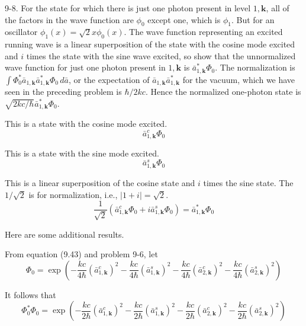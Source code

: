 \documentclass[12pt]{article}
\begin{document}
9-8.
For the state for which there is just one photon
present in level $1,\mathbf k$, all of the factors in the wave function are
$\phi_0$ except one, which is $\phi_1$.
But for an oscillator $\phi_1(x)=\sqrt2x\phi_0(x)$.
The wave function representing an excited running wave is a linear
superposition of the state with the cosine mode excited and $i$
times the state with the sine wave excited, so show that the
unnormalized wave function for just one photon present in
$1,\mathbf k$ is $\bar a_{1,\mathbf k}^*\Phi_0$.
The normalization is
$\int\Phi_0^*\bar a_{1,\mathbf k}\bar a_{1,\mathbf k}^*\Phi_0\,d\bar a$,
or the expectation of $\bar a_{1,\mathbf k}\bar a_{1,\mathbf k}^*$ for the
vacuum, which we have seen in the preceding problem is $\hbar/2kc$.
Hence the normalized one-photon state is
$\sqrt{2kc/\hbar}\bar a_{1,\mathbf k}^*\Phi_0$.

\bigskip
This is a state with the cosine mode excited.
\begin{equation*}
\bar a_{1,\mathbf k}^c\Phi_0
\end{equation*}

This is a state with the sine mode excited.
\begin{equation*}
\bar a_{1,\mathbf k}^s\Phi_0
\end{equation*}

This is a linear superposition of the cosine state and $i$ times the sine state.
The $1/\sqrt2$ is for normalization, i.e., $|1+i|=\sqrt2$.
\begin{equation*}
\frac{1}{\sqrt2}\left(\bar a_{1,\mathbf k}^c\Phi_0+i\bar a_{1,\mathbf k}^s\Phi_0\right)
=\bar a_{1,\mathbf k}^*\Phi_0
\end{equation*}

Here are some additional results.

\bigskip
From equation (9.43) and problem 9-6, let
\begin{equation*}
\Phi_0=\exp\left(
-\frac{kc}{4\hbar}(\bar a_{1,\mathbf k}^c)^2-\frac{kc}{4\hbar}(\bar a_{1,\mathbf k}^s)^2
-\frac{kc}{4\hbar}(\bar a_{2,\mathbf k}^c)^2-\frac{kc}{4\hbar}(\bar a_{2,\mathbf k}^s)^2
\right)
\end{equation*}

It follows that
\begin{equation*}
\Phi_0^*\Phi_0=\exp\left(
-\frac{kc}{2\hbar}(\bar a_{1,\mathbf k}^c)^2-\frac{kc}{2\hbar}(\bar a_{1,\mathbf k}^s)^2
-\frac{kc}{2\hbar}(\bar a_{2,\mathbf k}^c)^2-\frac{kc}{2\hbar}(\bar a_{2,\mathbf k}^s)^2
\right)
\end{equation*}
\end{document}
